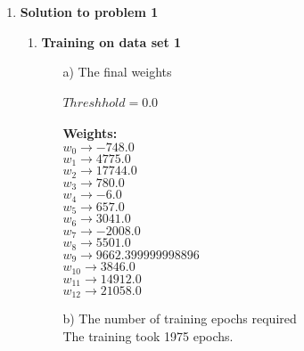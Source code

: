 \begin{enumerate}

	\item {\bf Solution to problem 1}
	
		\begin{enumerate}
			\item{\bf Training on data set 1}
				\begin{enumerate}
					\item[a)] The final weights \\ \\
						\(Threshhold = 0.0\) \\ \\
						\bf Weights: \\
						\(w_0 \rightarrow -748.0\) \\
						\(w_1 \rightarrow 4775.0\) \\
						\(w_2 \rightarrow 17744.0\) \\
						\(w_3 \rightarrow 780.0\) \\
						\(w_4 \rightarrow -6.0\) \\
						\(w_5 \rightarrow 657.0\) \\
						\(w_6 \rightarrow 3041.0\) \\
						\(w_7 \rightarrow -2008.0\) \\
						\(w_8 \rightarrow 5501.0\) \\
						\(w_9 \rightarrow 9662.399999998896\) \\
						\(w_{10} \rightarrow 3846.0\) \\
						\(w_{11} \rightarrow 14912.0\) \\
						\(w_{12} \rightarrow 21058.0\) \\
						
					\item[b)] The number of training epochs required \\
						\textnormal{The training took 1975 epochs.} \\
					

\end{enumerate}
\end{enumerate}
\end{enumerate}
